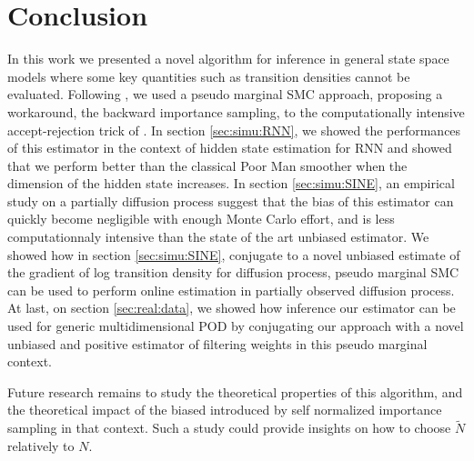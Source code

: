 \documentclass[12pt]{article}
\begin{document}
\section{Conclusion}

In this work we presented a novel algorithm for inference in general state space models where  some key quantities such as transition densities cannot be evaluated.
Following \cite{gloaguen2021pseudo}, we used 
a pseudo marginal SMC approach, proposing a workaround, the backward importance sampling, to the computationally intensive accept-rejection trick of \cite{gloaguen2018online}.
In section \ref{sec:simu:RNN}, we showed the performances of this estimator in the context of hidden state estimation for RNN and showed that we perform better than the classical Poor Man smoother when the dimension of the hidden state increases. 
In section \ref{sec:simu:SINE}, an empirical study on a partially diffusion process suggest that the bias of this estimator can quickly become negligible with enough Monte Carlo effort, and is less computationnaly intensive than the state of the art unbiased estimator.
We showed how in section \ref{sec:simu:SINE}, conjugate to a novel unbiased estimate of the gradient of log transition density for diffusion process, pseudo marginal SMC can be used to perform online estimation in partially observed diffusion process.
At last, on section \ref{sec:real:data}, we showed how inference our estimator can be used for generic multidimensional POD by conjugating our approach with a novel unbiased and positive estimator of filtering weights in this pseudo marginal context.

Future research remains to study the theoretical properties of this algorithm, and the theoretical impact of the biased introduced by self normalized importance sampling in that context. 
Such a study could provide insights on how to choose $\tilde{N}$ relatively to $N$.




\appendix 
\end{document}
